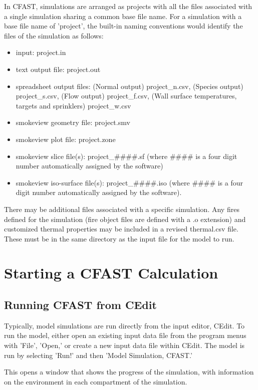 In CFAST, simulations are arranged as projects with all the files associated with a single simulation sharing a common base file name.  For a simulation with a base file name of 'project', the built-in naming conventions would identify the files of the simulation as follows:

\begin{itemize}
\item input: project.in
\item text output file: project.out
\item spreadsheet output files: (Normal output) project\_n.csv, (Species output) project\_s.csv, (Flow output) project\_f.csv, (Wall surface temperatures, targets and sprinklers) project\_w.csv
\item smokeview geometry file: project.smv
\item smokeview plot file: project.zone
\item smokeview slice file(s): project\_\#\#\#\#.sf (where \#\#\#\# is a four digit number automatically assigned by the software)
\item smokeview iso-surface file(s): project\_\#\#\#\#.iso (where \#\#\#\# is a four digit number automatically assigned by the software).
\end{itemize}

There may be additional files associated with a specific simulation.  Any fires defined for the simulation (fire object files are defined with a .o extension) and customized thermal properties may be included in a revised thermal.csv file.  These must be in the same directory as the input file for the model to run.

\section{Starting a CFAST Calculation}

\subsection{Running CFAST from CEdit}

Typically, model simulations are run directly from the input editor, CEdit.  To run the model, either open an existing input data file from the program menus with 'File', 'Open,' or create a new input data file within CEdit.  The model is run by selecting 'Run!' and then 'Model Simulation, CFAST.'

This opens a window that shows the progress of the simulation, with information on the environment in each compartment of the simulation.

